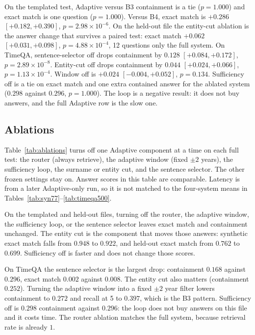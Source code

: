 \documentclass[11pt]{article}
\begin{document}
On the templated test, Adaptive versus B3 containment is a tie ($p=1.000$) and exact match is one question ($p=1.000$).
Versus B4, exact match is $+0.286$ $[+0.182, +0.390]$, $p=2.98\times 10^{-6}$.
On the held-out file the entity-cut ablation is the answer change that survives a paired test: exact match $+0.062$ $[+0.031, +0.098]$, $p=4.88\times 10^{-4}$, 12 questions only the full system.
On TimeQA, sentence-selector off drops containment by $0.128$ $[+0.084, +0.172]$, $p=2.89\times 10^{-8}$.
Entity-cut off drops containment by $0.044$ $[+0.024, +0.066]$, $p=1.13\times 10^{-4}$.
Window off is $+0.024$ $[ -0.004, +0.052 ]$, $p=0.134$.
Sufficiency off is a tie on exact match and one extra contained answer for the ablated system ($0.298$ against $0.296$, $p=1.000$).
The loop is a negative result: it does not buy answers, and the full Adaptive row is the slow one.

\subsection{Ablations}

Table~\ref{tab:ablations} turns off one Adaptive component at a time on each full test: the router (always retrieve), the adaptive window (fixed $\pm 2$ years), the sufficiency loop, the surname or entity cut, and the sentence selector.
The other frozen settings stay on.
Answer scores in this table are comparable.
Latency is from a later Adaptive-only run, so it is not matched to the four-system means in Tables~\ref{tab:syn77}--\ref{tab:timeqa500}.

On the templated and held-out files, turning off the router, the adaptive window, the sufficiency loop, or the sentence selector leaves exact match and containment unchanged.
The entity cut is the component that moves those answers: synthetic exact match falls from $0.948$ to $0.922$, and held-out exact match from $0.762$ to $0.699$.
Sufficiency off is faster and does not change those scores.

On TimeQA the sentence selector is the largest drop: containment $0.168$ against $0.296$, exact match $0.002$ against $0.008$.
The entity cut also matters (containment $0.252$).
Turning the adaptive window into a fixed $\pm 2$ year filter lowers containment to $0.272$ and recall at 5 to $0.397$, which is the B3 pattern.
Sufficiency off is $0.298$ containment against $0.296$: the loop does not buy answers on this file and it costs time.
The router ablation matches the full system, because retrieval rate is already $1$.
\end{document}
